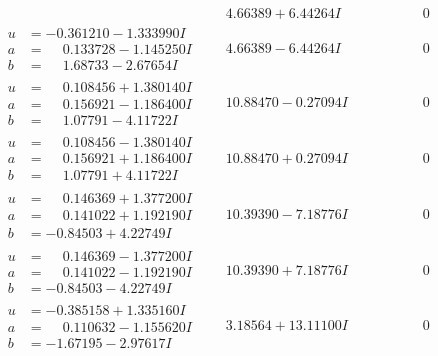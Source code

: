 \documentclass[1p]{elsarticle_modified}
\theoremstyle{definition}
\begin{document}
$$\begin{array}{c|c|c}
 & \phantom{-}4.66389 + 6.44264 I & \phantom{-0.000000 } 0 \\ \hline\begin{aligned}
u &= -0.361210 - 1.333990 I \\
a &= \phantom{-}0.133728 - 1.145250 I \\
b &= \phantom{-}1.68733 - 2.67654 I\end{aligned}
 & \phantom{-}4.66389 - 6.44264 I & \phantom{-0.000000 } 0 \\ \hline\begin{aligned}
u &= \phantom{-}0.108456 + 1.380140 I \\
a &= \phantom{-}0.156921 - 1.186400 I \\
b &= \phantom{-}1.07791 - 4.11722 I\end{aligned}
 & \phantom{-}10.88470 - 0.27094 I & \phantom{-0.000000 } 0 \\ \hline\begin{aligned}
u &= \phantom{-}0.108456 - 1.380140 I \\
a &= \phantom{-}0.156921 + 1.186400 I \\
b &= \phantom{-}1.07791 + 4.11722 I\end{aligned}
 & \phantom{-}10.88470 + 0.27094 I & \phantom{-0.000000 } 0 \\ \hline\begin{aligned}
u &= \phantom{-}0.146369 + 1.377200 I \\
a &= \phantom{-}0.141022 + 1.192190 I \\
b &= -0.84503 + 4.22749 I\end{aligned}
 & \phantom{-}10.39390 - 7.18776 I & \phantom{-0.000000 } 0 \\ \hline\begin{aligned}
u &= \phantom{-}0.146369 - 1.377200 I \\
a &= \phantom{-}0.141022 - 1.192190 I \\
b &= -0.84503 - 4.22749 I\end{aligned}
 & \phantom{-}10.39390 + 7.18776 I & \phantom{-0.000000 } 0 \\ \hline\begin{aligned}
u &= -0.385158 + 1.335160 I \\
a &= \phantom{-}0.110632 - 1.155620 I \\
b &= -1.67195 - 2.97617 I\end{aligned}
 & \phantom{-}3.18564 + 13.11100 I & \phantom{-0.000000 } 0 \\ \hline\begin{aligned}

\end{aligned}
\end{array}$$
\end{document}
